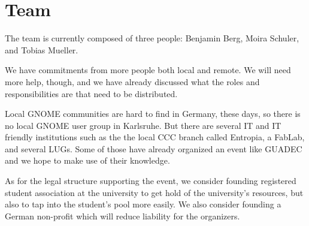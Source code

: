 
\section{Team}

The team is currently composed of three people:
Benjamin Berg, Moira Schuler, and Tobias Mueller.

We have commitments from more people both local and remote.
We will need more help, though, and we have already discussed
what the roles and responsibilities are that need to be distributed.

Local GNOME communities are hard to find in Germany, these days,
so there is no local GNOME user group in Karlsruhe.
But there are several IT and IT friendly institutions such as the
the local CCC branch called Entropia, a FabLab, and several LUGs.
Some of those have already organized an event like GUADEC and
we hope to make use of their knowledge.

As for the legal structure supporting the event,
we consider founding registered student association at
the university to get hold of the university's resources,
but also to tap into the student's pool more easily.
We also consider founding a German non-profit which will reduce
liability for the organizers.
